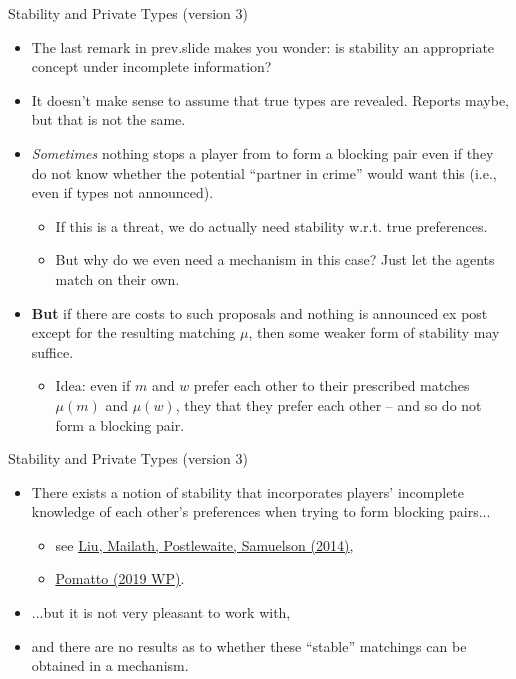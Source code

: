 \documentclass[english,10pt
,aspectratio=169
]{beamer}
\begin{document}
\begin{frame}{Stability and Private Types (version 3)}
\begin{itemize}
	\item The last remark in prev.slide makes you wonder: is \alert{stability} an appropriate concept under incomplete information?
	\item It doesn't make sense to assume that true types are revealed. Reports maybe, but that is not the same.
	\item \emph{Sometimes} nothing stops a player from  to form a blocking pair even if they do not know whether the potential ``partner in crime'' would want this (i.e., even if types not announced).
	\begin{itemize}
		\item If this is a threat, we do actually need stability w.r.t. true preferences.
		\item But why do we even need a mechanism in this case? Just let the agents match on their own.
	\end{itemize}
	\item \textbf{But} if there are costs to such proposals and nothing is announced ex post except for the resulting matching $\mu$, then some weaker form of stability may suffice.
	\begin{itemize}
		\item Idea: even if $m$ and $w$ prefer each other to their prescribed matches $\mu(m)$ and $\mu(w)$, they  that they prefer each other -- and so do not form a blocking pair.
	\end{itemize}
\end{itemize}
\end{frame}


\begin{frame}{Stability and Private Types (version 3)}
\begin{itemize}
	\item There exists a notion of stability that incorporates players' incomplete knowledge of each other's preferences when trying to form blocking pairs...
	\begin{itemize}
		\item see \href{https://onlinelibrary.wiley.com/doi/abs/10.3982/ECTA11183}{\uline{Liu, Mailath, Postlewaite, Samuelson (2014)}},
		\item \href{http://www.its.caltech.edu/~lpomatto/stable_matching.pdf}{\uline{Pomatto (2019 WP)}}.
	\end{itemize}
	\item ...but it is not very pleasant to work with,
	\item and there are no results as to whether these ``stable'' matchings can be obtained in a mechanism.
\end{itemize}
\end{frame}
\end{document}

